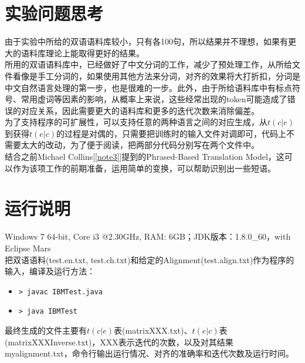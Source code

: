 \documentclass[11pt]{article}
\begin{document}
\section{实验问题思考}
\hspace{1.6em} 由于实验中所给的双语语料库较小，只有各100句，所以结果并不理想，如果有更大的语料库理论上能取得更好的结果。\\
\indent 所用的双语语料库中，已经做好了中文分词的工作，减少了预处理工作，从所给文件看像是手工分词的，如果使用其他方法来分词，对齐的效果将大打折扣，分词是中文自然语言处理的第一步，也是很难的一步。此外，由于所给语料库中有标点符号、常用虚词等因素的影响，从概率上来说，这些经常出现的token可能造成了错误的对应关系，因此需要更大的语料库和更多的迭代次数来消除偏差。\\
\indent 为了支持程序的可扩展性，可以支持任意的两种语言之间的对应生成，从$t(c|e)$到获得$t(e|c)$的过程是对偶的，只需要把训练时的输入文件对调即可，代码上不需要太大的改动，为了便于阅读，把两部分代码分别写在两个文件中。\\
\indent 结合之前Michael Collins[\ref{note3}]提到的Phrased-Based Translation Model，这可以作为该项工作的前期准备，运用简单的变换，可以帮助识别出一些短语。
\section{运行说明}
\hspace{1.6em} Windows 7 64-bit, Core i3 @2.30GHz, RAM: 6GB；JDK版本：1.8.0\_60，with Eclipse Mars\\
\indent 把双语语料(test.en.txt, test.ch.txt)和给定的Alignment(test.align.txt)作为程序的输入，编译及运行方法：
\begin{itemize}
  \item \texttt{> javac IBMTest.java}
  \item \texttt{> java IBMTest}
\end{itemize}
\hspace*{1.6em} 最终生成的文件主要有$t(c|e)$表(matrixXXX.txt)、$t(e|c)$表(matrixXXXInverse.txt)，XXX表示迭代的次数，以及对其结果myalignment.txt，命令行输出运行情况、对齐的准确率和迭代次数及运行时间。
\end{document}
